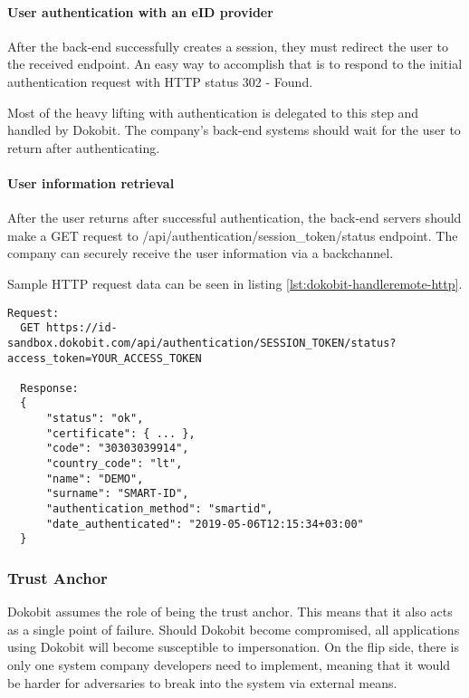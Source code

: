 \paragraph{User authentication with an eID provider}

After the back-end successfully creates a session, they must redirect the user to the received endpoint. An easy way to accomplish that is to respond to the initial authentication request with HTTP status 302 - Found.

Most of the heavy lifting with authentication is delegated to this step and handled by Dokobit. The company's back-end systems should wait for the user to return after authenticating.

\paragraph{User information retrieval}

After the user returns after successful authentication, the back-end servers should make a {GET} request to {/api/authentication/session\_token/status} endpoint. The company can securely receive the user information via a backchannel.

Sample HTTP request data can be seen in listing \ref{lst:dokobit-handleremote-http}.

\begin{lstlisting}[caption={Handling Dokobit session creation}, label={lst:dokobit-handleremote-http}]
  Request:
  GET https://id-sandbox.dokobit.com/api/authentication/SESSION_TOKEN/status?access_token=YOUR_ACCESS_TOKEN
  
  Response:
  {
      "status": "ok",
      "certificate": { ... },
      "code": "30303039914",
      "country_code": "lt",
      "name": "DEMO",
      "surname": "SMART-ID",
      "authentication_method": "smartid",
      "date_authenticated": "2019-05-06T12:15:34+03:00"
  }
\end{lstlisting}

\subsubsection{Trust Anchor}

Dokobit assumes the role of being the trust anchor. This means that it also acts as a single point of failure. Should Dokobit become compromised, all applications using Dokobit will become susceptible to impersonation. On the flip side, there is only one system company developers need to implement, meaning that it would be harder for adversaries to break into the system via external means.

